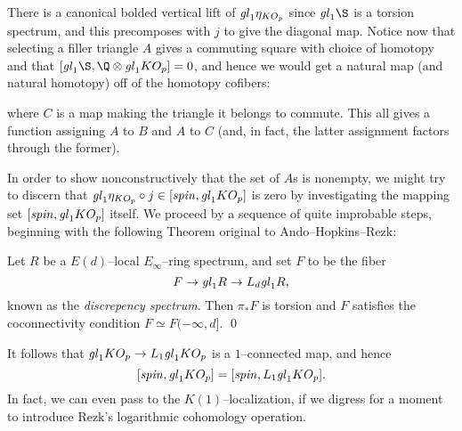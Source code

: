 There is a canonical bolded vertical lift of \(\mathit{gl}_1 \eta_{KO_p}\) since \(\gl_1 \S\) is a torsion spectrum, and this precomposes with \(j\) to give the diagonal map.  Notice now that selecting a filler triangle \(A\) gives a commuting square with choice of homotopy and that \([\gl_1 \S, \Q \otimes \gl_1 KO_p] = 0\), and hence we would get a natural map (and natural homotopy) off of the homotopy cofibers:
\begin{center}
\end{center}
where \(C\) is a map making the triangle it belongs to commute.  This all gives a function assigning \(A\) to \(B\) and \(A\) to \(C\) (and, in fact, the latter assignment factors through the former).

In order to show nonconstructively that the set of \(A\)s is nonempty, we might try to discern that \(\mathit{gl}_1 \eta_{KO_p} \circ j \in [\mathit{spin}, \mathit{gl}_1 KO_p]\) is zero by investigating the mapping set \([\mathit{spin}, \mathit{gl}_1 KO_p]\) itself.  We proceed by a sequence of quite improbable steps, beginning with the following Theorem original to Ando--Hopkins--Rezk:
\begin{theorem}\label{DiscrepancyDefinition}
Let \(R\) be a \(E(d)\)--local \(E_\infty\)--ring spectrum, and set \(F\) to be the fiber \[F \to \mathit{gl}_1 R \to L_d \mathit{gl}_1 R,\] known as the \textit{discrepency spectrum}.  Then \(\pi_* F\) is torsion and \(F\) satisfies the coconnectivity condition \(F \simeq F(-\infty, d]\). \qed
\end{theorem}

\noindent It follows that \(\mathit{gl}_1 KO_p \to L_1 \mathit{gl}_1 KO_p\) is a \(1\)--connected map, and hence \[[\mathit{spin}, \mathit{gl}_1 KO_p] = [\mathit{spin}, L_1 \mathit{gl}_1 KO_p].\]  In fact, we can even pass to the \(K(1)\)--localization, if we digress for a moment to introduce Rezk's logarithmic cohomology operation.

